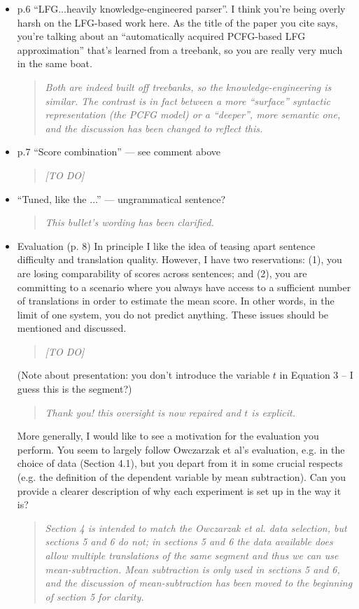 \documentclass[letterpaper,12pt]{article}
\newenvironment{response}
{\begin{quotation} \it}
  {\end{quotation}}
\begin{document}
\begin{itemize}
\item  p.6 ``LFG...heavily knowledge-engineered parser''. I think you're
  being overly harsh on the LFG-based work here. As the title of the
  paper you cite says, you're talking about an ``automatically acquired
  PCFG-based LFG approximation'' that's learned from a treebank, so you
  are really very much in the same boat.
  \begin{response}
    Both are indeed built off treebanks, so the knowledge-engineering
    is similar. The contrast is in fact between a more ``surface''
    syntactic representation (the PCFG model) or a ``deeper'', more
    semantic one, and the discussion has been changed to reflect this.
  \end{response}

\item p.7 ``Score combination'' --- see comment above 
  \begin{response}
    [TO DO]
  \end{response}

\item ``Tuned, like the ...''  --- ungrammatical sentence?
  \begin{response}
    This bullet's wording has been clarified.
  \end{response}

\item  Evaluation (p. 8) In principle I like the idea of teasing apart
  sentence difficulty and translation quality. However, I have two
  reservations: (1), you are losing comparability of scores across
  sentences; and (2), you are committing to a scenario where you
  always have access to a sufficient number of translations in order
  to estimate the mean score. In other words, in the limit of one
  system, you do not predict anything.  These issues should be
  mentioned and discussed.  
  \begin{response}
    [TO DO]
  \end{response}
  (Note about presentation: you don't
  introduce the variable $t$ in Equation 3 -- I guess this is the
  segment?)
  \begin{response}
    Thank you! this oversight is now repaired and $t$ is explicit.
  \end{response}
 
  More generally, I would like to see a motivation for the evaluation
  you perform. You seem to largely follow Owczarzak et al's
  evaluation, e.g. in the choice of data (Section 4.1), but you depart
  from it in some crucial respects (e.g. the definition of the
  dependent variable by mean subtraction). Can you provide a clearer
  description of why each experiment is set up in the way it is?
  \begin{response}
    Section 4 is intended to match the Owczarzak \textit{et al.} data
    selection, but sections 5 and 6 do not; in sections 5 and 6 the
    data available \emph{does} allow multiple translations of the same
    segment and thus we can use mean-subtraction. Mean subtraction is
    only used in sections 5 and 6, and the discussion of
    mean-subtraction has been moved to the beginning of section 5 for
    clarity.
  \end{response}


\end{itemize}
\end{document}
